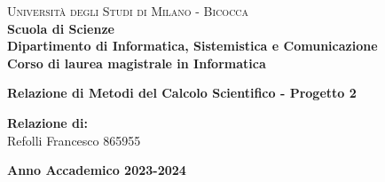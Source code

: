 \documentclass[a4paper,11pt,oneside, table]{article}
\begin{document}
    \begin{titlepage}
        \noindent
        \begin{minipage}[t]{0.19\textwidth}
        \end{minipage}
        \begin{minipage}[t]{0.81\textwidth}
        {
                {\textsc{Università degli Studi di Milano - Bicocca}} \\
                \textbf{Scuola di Scienze} \\
                \textbf{Dipartimento di Informatica, Sistemistica e Comunicazione} \\
                \textbf{Corso di laurea magistrale in Informatica} \\
                \par
        }
        \end{minipage}
    	\vspace{40mm}
    	\begin{center}
            {\LARGE{
                    \textbf{Relazione di Metodi del Calcolo Scientifico - Progetto 2}
                    \par
            }}
        \end{center}
        
        \vspace{50mm}
        
        \vspace{15mm}

        \begin{flushright}
            {\large \textbf{Relazione di:}} \\
            \large{Refolli Francesco}
            \large{865955}
        \end{flushright}
        
        \vspace{40mm}
        \begin{center}
            {\large{\bf Anno Accademico 2023-2024}}
        \end{center}
        \restoregeometry
    \end{titlepage}
\end{document}
